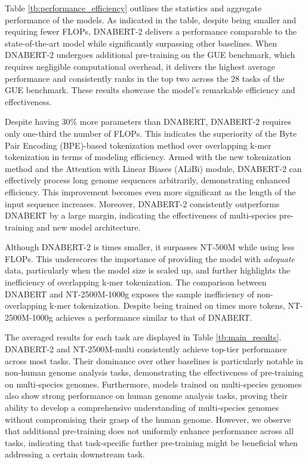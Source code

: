 \documentclass{article}
\begin{document}
Table \ref{tb:performance_efficiency} outlines the statistics and aggregate performance of the models. As indicated in the table, despite being  smaller and requiring  fewer FLOPs, DNABERT-2 delivers a performance comparable to the state-of-the-art model while significantly surpassing other baselines. When DNABERT-2 undergoes additional pre-training on the GUE benchmark, which requires negligible computational overhead, it delivers the highest average performance and consistently ranks in the top two across the 28 tasks of the GUE benchmark. These results showcase the model's remarkable efficiency and effectiveness.

Despite having 30\% more parameters than DNABERT, DNABERT-2 requires only one-third the number of FLOPs. This indicates the superiority of the Byte Pair Encoding (BPE)-based tokenization method over overlapping k-mer tokenization in terms of modeling efficiency. Armed with the new tokenization method and the Attention with Linear Biases (ALiBi) module, DNABERT-2 can effectively process long genome sequences arbitrarily, demonstrating enhanced efficiency. This improvement becomes even more significant as the length of the input sequence increases. Moreover, DNABERT-2 consistently outperforms DNABERT by a large margin, indicating the effectiveness of multi-species pre-training and new model architecture.


Although DNABERT-2 is  times smaller, it surpasses NT-500M while using less FLOPs. This underscores the importance of providing the model with \textit{adequate} data, particularly when the model size is scaled up, and further highlights the inefficiency of overlapping k-mer tokenization. The comparison between DNABERT and NT-2500M-1000g exposes the sample inefficiency of non-overlapping k-mer tokenization. Despite being trained on  times more tokens, NT-2500M-1000g achieves a performance similar to that of DNABERT.

The averaged results for each task are displayed in Table \ref{tb:main_results}. DNABERT-2 and NT-2500M-multi consistently achieve top-tier performance across most tasks. Their dominance over other baselines is particularly notable in non-human genome analysis tasks, demonstrating the effectiveness of pre-training on multi-species genomes. Furthermore, models trained on multi-species genomes also show strong performance on human genome analysis tasks, proving their ability to develop a comprehensive understanding of multi-species genomes without compromising their grasp of the human genome. However, we observe that additional pre-training does not uniformly enhance performance across all tasks, indicating that task-specific further pre-training might be beneficial when addressing a certain downstream task.
\end{document}
